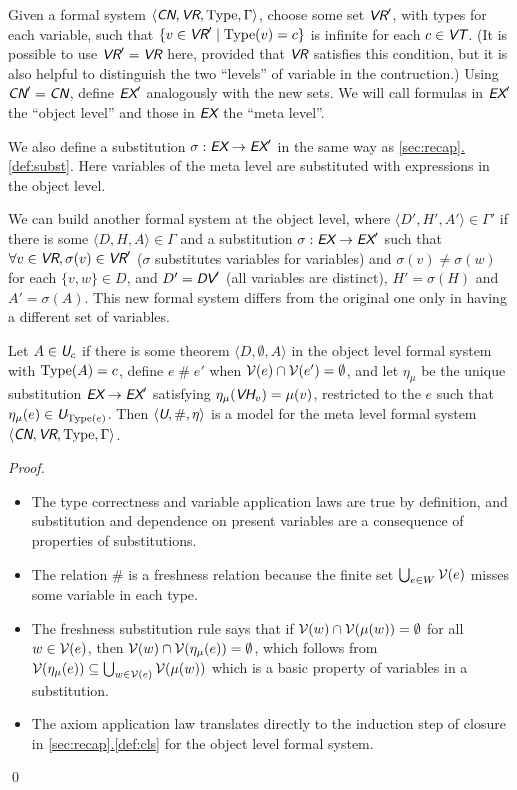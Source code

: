 \documentclass[runningheads,a4paper]{llncs}
\newcommand{\cn}{\textit{\textsf{CN}}} %
\newcommand{\vr}{\textit{\textsf{VR}}} %
\newcommand{\ex}{\textit{\textsf{EX}}} %
\newcommand{\dv}{\textit{\textsf{DV}}} %
\newcommand{\vh}{\textit{\textsf{VH}}} %
\newcommand{\vt}{\textit{\textsf{VT}}} %
\newcommand{\uv}{\textit{\textsf{U}}} %
\newcommand{\ang}[1]{\langle#1\rangle}
\newcommand{\type}{{\rm Type}}
\newcommand{\fresh}{\mathbin{\#}}
\begin{document}
Given a formal system $\ang{\cn,\vr,\type,\Gamma}$, choose some set $\vr'$, with types for each variable, such that $\{v\in\vr'\mid\type(v)=c\}$ is infinite for each $c\in\vt$. (It is possible to use $\vr'=\vr$ here, provided that $\vr$ satisfies this condition, but it is also helpful to distinguish the two ``levels'' of variable in the contruction.) Using $\cn'=\cn$, define $\ex'$ analogously with the new sets. We will call formulas in $\ex'$ the ``object level'' and those in $\ex$ the ``meta level''.

We also define a substitution $\sigma:\ex\to\ex'$ in the same way as \hyperref[def:subst]{\autoref*{sec:recap}.\ref*{def:subst}}. Here variables of the meta level are substituted with expressions in the object level.

We can build another formal system at the object level, where $\ang{D',H',A'}\in\Gamma'$ if there is some $\ang{D,H,A}\in\Gamma$ and a substitution $\sigma:\ex\to\ex'$ such that $\forall v\in\vr,\sigma(v)\in\vr'$ ($\sigma$ substitutes variables for variables) and $\sigma(v)\ne\sigma(w)$ for each $\{v,w\}\in D$, and $D'=\dv'$ (all variables are distinct), $H'=\sigma(H)$ and $A'=\sigma(A)$. This new formal system differs from the original one only in having a different set of variables.

\begin{theorem}\label{thm:godmod}
Let $A\in\uv_c$ if there is some theorem $\ang{D,\emptyset,A}$ in the object level formal system with $\type(A)=c$, define $e\fresh e'$ when ${\cal V}(e)\cap{\cal V}(e')=\emptyset$, and let $\eta_\mu$ be the unique substitution $\ex\to\ex'$ satisfying $\eta_\mu(\vh_v)=\mu(v)$, restricted to the $e$ such that $\eta_\mu(e)\in\uv_{\type(e)}$. Then $\ang{\uv,\fresh,\eta}$ is a model for the meta level formal system $\ang{\cn,\vr,\type,\Gamma}$.
\end{theorem}
\begin{proof}\leavevmode
\begin{itemize}
  \item The type correctness and variable application laws are true by definition, and substitution and dependence on present variables are a consequence of properties of substitutions.
  \item The relation $\fresh$ is a freshness relation because the finite set $\bigcup_{e\in W}{\cal V}(e)$ misses some variable in each type.
  \item The freshness substitution rule says that if ${\cal V}(w)\cap{\cal V}(\mu(w))=\emptyset$ for all $w\in{\cal V}(e)$, then ${\cal V}(w)\cap{\cal V}(\eta_\mu(e))=\emptyset$, which follows from ${\cal V}(\eta_\mu(e))\subseteq \bigcup_{w\in{\cal V}(e)}{\cal V}(\mu(w))$ which is a basic property of variables in a substitution.
  \item The axiom application law translates directly to the induction step of closure in \hyperref[def:cls]{\autoref*{sec:recap}.\ref*{def:cls}} for the object level formal system.
\end{itemize}
\qed\end{proof}
\end{document}
